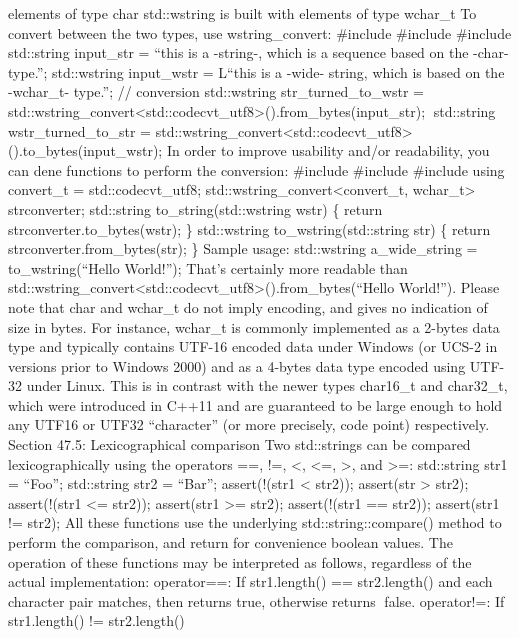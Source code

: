 elements of type char std::wstring is built with elements of type
wchar\_t To convert between the two types, use wstring\_convert:
\#include \#include \#include std::string input\_str = ``this is a
-string-, which is a sequence based on the -char- type.''; std::wstring
input\_wstr = L``this is a -wide- string, which is based on the
-wchar\_t- type.''; // conversion std::wstring str\_turned\_to\_wstr =
std::wstring\_convert\textless std::codecvt\_utf8\textgreater().from\_bytes(input\_str);
std::string wstr\_turned\_to\_str =
std::wstring\_convert\textless std::codecvt\_utf8\textgreater().to\_bytes(input\_wstr);
In order to improve usability and/or readability, you can dene functions
to perform the conversion: \#include \#include \#include using
convert\_t = std::codecvt\_utf8;
std::wstring\_convert\textless convert\_t, wchar\_t\textgreater{}
strconverter; std::string to\_string(std::wstring wstr) \{ return
strconverter.to\_bytes(wstr); \} std::wstring to\_wstring(std::string
str) \{ return strconverter.from\_bytes(str); \} Sample usage:
std::wstring a\_wide\_string = to\_wstring(``Hello World!''); That's
certainly more readable than
std::wstring\_convert\textless std::codecvt\_utf8\textgreater().from\_bytes(``Hello
World!''). Please note that char and wchar\_t do not imply encoding, and
gives no indication of size in bytes. For instance, wchar\_t is commonly
implemented as a 2-bytes data type and typically contains UTF-16 encoded
data under Windows (or UCS-2 in versions prior to Windows 2000) and as a
4-bytes data type encoded using UTF-32 under Linux. This is in contrast
with the newer types char16\_t and char32\_t, which were introduced in
C++11 and are guaranteed to be large enough to hold any UTF16 or UTF32
``character'' (or more precisely, code point) respectively. Section
47.5: Lexicographical comparison Two std::strings can be compared
lexicographically using the operators ==, !=, \textless, \textless=,
\textgreater, and \textgreater=: std::string str1 = ``Foo''; std::string
str2 = ``Bar''; assert(!(str1 \textless{} str2)); assert(str
\textgreater{} str2); assert(!(str1 \textless= str2)); assert(str1
\textgreater= str2); assert(!(str1 == str2)); assert(str1 != str2); All
these functions use the underlying std::string::compare() method to
perform the comparison, and return for convenience boolean values. The
operation of these functions may be interpreted as follows, regardless
of the actual implementation: operator==: If str1.length() ==
str2.length() and each character pair matches, then returns true,
otherwise returns false. operator!=: If str1.length() != str2.length()
